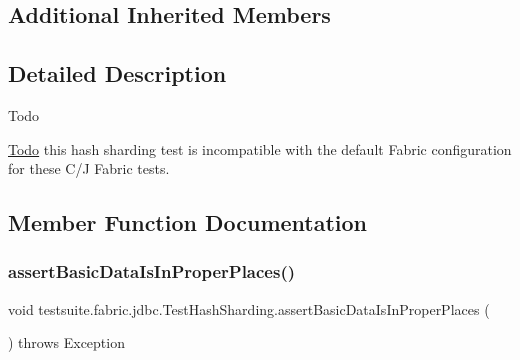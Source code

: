 \subsection*{Additional Inherited Members}


\subsection{Detailed Description}
\begin{DoxyRefDesc}{Todo}
\item[\mbox{\hyperlink{todo__todo000001}{Todo}}]this hash sharding test is incompatible with the default Fabric configuration for these C/J Fabric tests. \end{DoxyRefDesc}


\subsection{Member Function Documentation}
\mbox{\label{classtestsuite_1_1fabric_1_1jdbc_1_1_test_hash_sharding_a54c7662d69f56fc657d35bd049d87f1b}} 
\subsubsection{\texorpdfstring{assert\+Basic\+Data\+Is\+In\+Proper\+Places()}{assertBasicDataIsInProperPlaces()}}
{\footnotesize\ttfamily void testsuite.\+fabric.\+jdbc.\+Test\+Hash\+Sharding.\+assert\+Basic\+Data\+Is\+In\+Proper\+Places (\begin{DoxyParamCaption}{ }\end{DoxyParamCaption}) throws Exception\hspace{0.3cm}{\ttfamily [protected]}}

